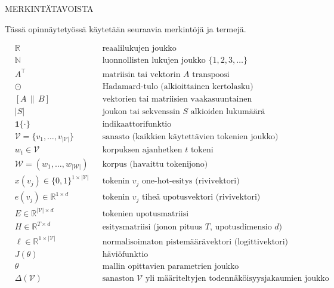 
\thispagestyle{plain}
\begin{center}
  \large{MERKINTÄTAVOISTA}
\end{center}
Tässä opinnäytetyössä käytetään seuraavia merkintöjä ja termejä.

\begin{align*}
  &\mathbb{R} &&\text{reaalilukujen joukko} \\
  &\mathbb{N} &&\text{luonnollisten lukujen joukko } \{1, 2, 3, \dots\} \\
  &A^{\top} &&\text{matriisin tai vektorin } A \text{ transpoosi} \\
  &\odot &&\text{Hadamard-tulo (alkioittainen kertolasku)} \\
  &[A \,\|\, B] &&\text{vektorien tai matriisien vaakasuuntainen ketjuttaminen} \\
  &|S| &&\text{joukon tai sekvenssin } S \text{ alkioiden lukumäärä} \\
  &\mathbf{1}\{\cdot\} &&\text{indikaattorifunktio} \\
  &\mathcal{V} = \{v_1, \dots, v_{|\mathcal{V}|}\} &&\text{sanasto (kaikkien käytettävien tokenien joukko)} \\
  &w_t \in \mathcal{V} &&\text{korpuksen ajanhetken } t \text{ tokeni} \\
  &\mathcal{W} = (w_1, \dots, w_{|\mathcal{W}|}) &&\text{korpus (havaittu tokenijono)} \\
  &x(v_j) \in \{0, 1\}^{1 \times |\mathcal{V}|} &&\text{tokenin } v_j \text{ one-hot-esitys (rivivektori)} \\
  &e(v_j) \in \mathbb{R}^{1 \times d} &&\text{tokenin } v_j \text{ tiheä upotusvektori (rivivektori)} \\
  &E \in \mathbb{R}^{|\mathcal{V}| \times d} &&\text{tokenien upotusmatriisi} \\
  &H \in \mathbb{R}^{T \times d} &&\text{esitysmatriisi (jonon pituus } T\text{, upotusdimensio } d\text{)} \\
  &\ell \in \mathbb{R}^{1 \times |\mathcal{V}|} &&\text{normalisoimaton pistemäärävektori (logittivektori)} \\
  &J(\theta) &&\text{häviöfunktio} \\
  &\theta &&\text{mallin opittavien parametrien joukko} \\
  &\Delta(\mathcal{V}) &&\text{sanaston } \mathcal{V} \text{ yli määriteltyjen todennäköisyysjakaumien joukko}
\end{align*}
